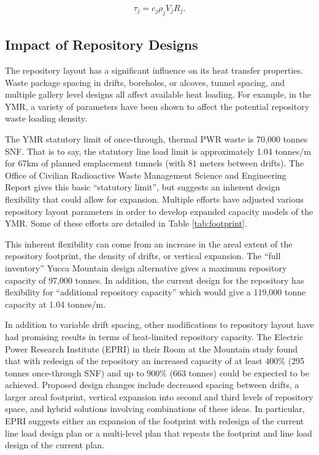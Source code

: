 \begin{align}
  \tau_j = c_j \rho_j V_j R_j.
\end{align}

\subsection{Impact of Repository Designs}

The repository layout has a significant influence on its heat transfer 
properties.  Waste package spacing in drifts, boreholes, or alcoves, tunnel
spacing, and multiple gallery level designs all affect  available 
heat loading.  For example, in the \gls{YMR}, a variety of parameters have been 
shown to affect the potential repository waste loading density. 

The \gls{YMR} statutory limit of once-through, thermal PWR waste is 70,000 tonnes 
SNF.  That is to say, the statutory line load limit is approximately 1.04 tonnes/m
for 67km of planned emplacement tunnels (with 81 meters between drifts). The
Office of Civilian Radioactive Waste Management Science and Engineering Report
gives this basic ``statutory limit'', but suggests an inherent design
flexibility that could allow for expansion. Multiple efforts have adjusted 
various repository layout parameters in order to develop expanded capacity 
models of the \gls{YMR}. Some of these efforts are detailed in Table 
\ref{tab:footprint}.

 

This inherent flexibility can come from an increase in the areal extent of the 
repository footprint, the density of drifts, or vertical expansion. The  ``full inventory'' Yucca
Mountain design alternative gives a maximum repository capacity of 97,000
tonnes. In addition, the current design for the repository has flexibility for
``additional repository capacity'' which would give a 119,000 tonne capacity at
1.04 tonnes/m.\cite{doe_yucca_2002} 

In addition to variable drift spacing, other modifications to repository layout
have had promising results in terms of heat-limited repository capacity. The
Electric Power Research Institute (EPRI) in their Room at the Mountain study
found that with redesign of the repository an increased capacity of at least
$400\%$ (295 tonnes once-through SNF) and up to $900\%$ (663 tonnes) could be
expected to be achieved. Proposed design changes include decreased spacing
between drifts, a larger areal footprint, vertical expansion into second and
third levels of repository space, and hybrid solutions involving combinations
of these ideas. In particular, EPRI suggests either an expansion of the
footprint with redesign of the current line load design plan or a
multi-level plan that repeats the footprint and line load design of the current
plan\cite{kessler_room_2006}.


